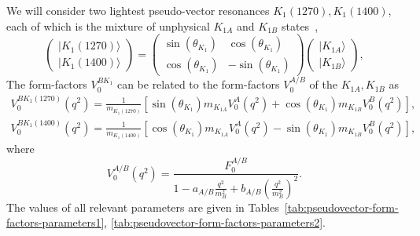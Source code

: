 \documentclass[a4paper,12pt,dvipsnames,usernames]{article}
\begin{document}
We will consider two lightest pseudo-vector resonances $K_{1}(1270), K_{1}(1400)$, each of which is the mixture of unphysical $K_{1A}$ and $K_{1B}$ states~\cite{Bashiry:2009wq},
\begin{equation}
    \begin{pmatrix} |K_{1}(1270) \rangle \\ |K_{1}(1400) \rangle \end{pmatrix} =  \begin{pmatrix} \sin(\theta_{K_{1}}) & \cos(\theta_{K_{1}}) \\ \cos(\theta_{K_{1}}) & -\sin(\theta_{K_{1}})\end{pmatrix} 
    \begin{pmatrix} |K_{1A} \rangle \\ |K_{1B}\rangle \end{pmatrix},
\end{equation}
The form-factors $V_{0}^{BK_{1}}$ can be related to the form-factors $V_{0}^{A/B}$ of the $K_{1A}, K_{1B}$ as 
\begin{align}
V^{BK_{1}(1270)}_{0}(q^{2}) =\frac{1}{m_{K_{1}(1270)}}\left[\sin(\theta_{K_{1}})m_{K_{1A}}V_{0}^{A}(q^{2})+\cos(\theta_{K_{1}})m_{K_{1B}}V_{0}^{B}(q^{2})\right], \label{eq:pseudovector-form-factors1} \\
V^{BK_{1}(1400)}_{0}(q^{2}) =\frac{1}{m_{K_{1}(1400)}}\left[\cos(\theta_{K_{1}})m_{K_{1A}}V_{0}^{A}(q^{2})-\sin(\theta_{K_{1}})m_{K_{1B}}V_{0}^{B}(q^{2})\right],
    \label{eq:pseudovector-form-factors2}
\end{align}
where
\begin{equation}
    V_{0}^{A/B}(q^{2}) = \frac{F^{A/B}_{0}}{1-a_{A/B}\frac{q^{2}}{m_{B}^{2}}+b_{A/B}\left(\frac{q^{2}}{m_{B}^{2}}\right)^{2}}.
    \label{eq:pseudovector-form-factors-unphys}
\end{equation}
The values of all relevant parameters are given in Tables~\ref{tab:pseudovector-form-factors-parameters1}, \ref{tab:pseudovector-form-factors-parameters2}. 
\end{document}
